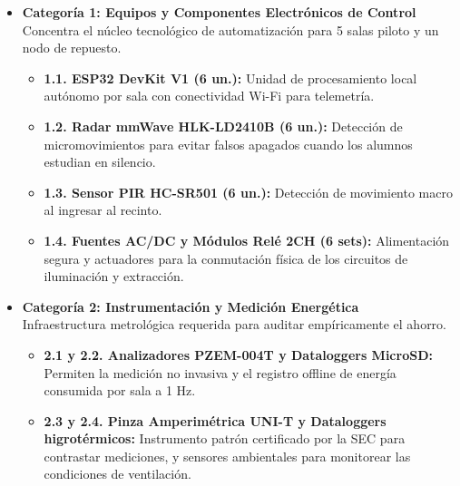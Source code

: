 \begin{itemize}
    \item \textbf{Categoría 1: Equipos y Componentes Electrónicos de Control} \\
    Concentra el núcleo tecnológico de automatización para 5 salas piloto y un nodo de repuesto.

    \begin{itemize}
        \item \textbf{1.1. ESP32 DevKit V1 (6 un.):} Unidad de procesamiento local autónomo por sala con conectividad Wi-Fi para telemetría.
        
        \item \textbf{1.2. Radar mmWave HLK-LD2410B (6 un.):} Detección de micromovimientos para evitar falsos apagados cuando los alumnos estudian en silencio.
        
        \item \textbf{1.3. Sensor PIR HC-SR501 (6 un.):} Detección de movimiento macro al ingresar al recinto.
        
        \item \textbf{1.4. Fuentes AC/DC y Módulos Relé 2CH (6 sets):} Alimentación segura y actuadores para la conmutación física de los circuitos de iluminación y extracción. \\
    \end{itemize}
    
    \vspace{-0.3cm}

    \item \textbf{Categoría 2: Instrumentación y Medición Energética} \\
    Infraestructura metrológica requerida para auditar empíricamente el ahorro.
        
    \begin{itemize}       
        \item \textbf{2.1 y 2.2. Analizadores PZEM-004T y Dataloggers MicroSD:} Permiten la medición no invasiva y el registro offline de energía consumida por sala a 1 Hz.
            
        \item \textbf{2.3 y 2.4. Pinza Amperimétrica UNI-T y Dataloggers higrotérmicos:} Instrumento patrón certificado por la SEC para contrastar mediciones, y sensores ambientales para monitorear las condiciones de ventilación. \\
    \end{itemize}
    
    \vspace{-0.3cm}
        

\end{itemize}

